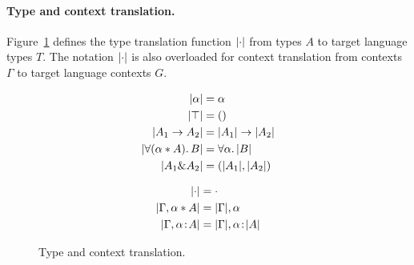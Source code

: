 \paragraph{Type and context translation.}
Figure~\ref{fig:type-and-context-translation} defines the type translation
function $\lvert \cdot \rvert$ from \name types $A$ to target language types $T$. 
The notation $\lvert \cdot \rvert$ is also overloaded for context translation from \name
contexts $\Gamma$ to target language contexts $G$.

\begin{figure}[!t]
\begin{spacing}{0.5}
\begin{minipage}[t]{.5\textwidth}

  \begin{align*}
    \lvert \alpha \rvert                &= \alpha \\
    \lvert \top \rvert                  &= () \\
    \lvert A_1 \to A_2 \rvert         &= \lvert A_1 \rvert \to \lvert A_2 \rvert \\
    \lvert \forall (\alpha * A).\, B \rvert  &= \forall \alpha.\, \lvert B \rvert \\
    \lvert A_1 \& A_2 \rvert      &= (\lvert A_1 \rvert, \lvert A_2 \rvert) \\
  \end{align*}
\end{minipage}
\begin{minipage}[t]{.5\textwidth}

  \begin{align*}
    \lvert \cdot \rvert                        &= \cdot \\
    \lvert \Gamma, \alpha * A \rvert &= \lvert \Gamma \rvert, \alpha \\
    \lvert \Gamma, \alpha \!:\! A \rvert   &= \lvert \Gamma \rvert, \alpha \!:\! \lvert A \rvert
  \end{align*}
\end{minipage}
\end{spacing}
  \caption{Type and context translation.}
  \label{fig:type-and-context-translation}
\end{figure}



